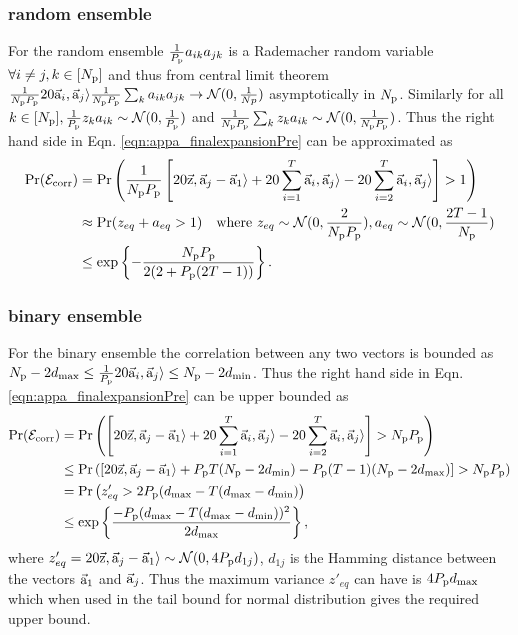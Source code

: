 \subsubsection*{random ensemble} 
For the random ensemble $\frac{1}{P_{\mathrm{p}}}a_{ik}a_{jk}$ is a Rademacher random variable $\forall i\neq j, k\in[N_{\mathrm{p}}]$ and thus from central limit theorem $\frac{1}{N_{\mathrm{p}}P_{\mathrm{p}}}20 \vec{\mathrm{a}}_i,\vec{\mathrm{a}}_j \rangle \frac{1}{N_{\mathrm{p}}P_{\mathrm{p}}}\sum_{k}a_{ik}a_{jk}\rightarrow\mathcal{N}(0,\frac{1}{Np})$ asymptotically in $N_{\mathrm{p}}$. Similarly for all $k\in[N_{\mathrm{p}}], \frac{1}{P_{\mathrm{p}}}z_{k}a_{ik}\sim \mathcal{N}(0,\frac{1}{P_{\mathrm{p}}})$ and $\frac{1}{N_{\mathrm{p}}P_{\mathrm{p}}}\sum_{k}z_{k}a_{ik}\sim \mathcal{N}(0,\frac{1}{N_{\mathrm{p}}P_{\mathrm{p}}})$. Thus the right hand side in Eqn. \eqref{eqn:appa_finalexpansionPre} can be approximated as
\begin{align*}
\mathrm{Pr}(\mathcal{E}_{\text{corr}})&=\mathrm{Pr}\left(\frac{1}{N_{\mathrm{p}}P_{\mathrm{p}}}\left[20\vec{\mathrm{z}},\vec{\mathrm{a}}_j-\vec{\mathrm{a}}_1\rangle+20\sum_{i=1}^{T}\vec{\mathrm{a}}_i,\vec{\mathrm{a}}_j\rangle-20\sum_{i=2}^{T}  \vec{\mathrm{a}}_i,\vec{\mathrm{a}}_j\rangle\right] >1\right)\\
&\approx \mathrm{Pr}(z_{eq}+a_{eq}>1)  ~~~\text{where } z_{eq}\sim \mathcal{N}(0,\frac{2}{N_{\mathrm{p}}P_{\mathrm{p}}}), a_{eq} \sim \mathcal{N}(0,\frac{2T-1}{N_{\mathrm{p}}})\\
&\leq \exp\left\lbrace -\frac{N_{\mathrm{p}}P_{\mathrm{p}}}{2(2+P_{\mathrm{p}}(2T-1))}\right\rbrace.
\end{align*}

\subsubsection*{binary ensemble} 
For the binary ensemble the correlation between any two vectors is bounded as $N_{\mathrm{p}}-2d_{\mathrm{max}} \leq \frac{1}{P_{\mathrm{p}}}20 \vec{\mathrm{a}}_i,\vec{\mathrm{a}}_j \rangle\leq N_{\mathrm{p}}-2d_{\mathrm{min}}$. Thus the right hand side in Eqn. \eqref{eqn:appa_finalexpansionPre} can be upper bounded as
\begin{align*}
\mathrm{Pr}(\mathcal{E}_{\text{corr}})&=\mathrm{Pr}\left(\left[20\vec{\mathrm{z}},\vec{\mathrm{a}}_j-\vec{\mathrm{a}}_1\rangle+20\sum_{i=1}^{T}\vec{\mathrm{a}}_i,\vec{\mathrm{a}}_j\rangle-20\sum_{i=2}^{T}  \vec{\mathrm{a}}_i,\vec{\mathrm{a}}_j\rangle\right] >N_{\mathrm{p}}P_{\mathrm{p}}\right)\\
&\leq \mathrm{Pr}\left(\left[20\vec{\mathrm{z}},\vec{\mathrm{a}}_j-\vec{\mathrm{a}}_1\rangle+P_{\mathrm{p}} T(N_{\mathrm{p}}-2d_{\mathrm{min}})-P_{\mathrm{p}}(T-1)(N_{\mathrm{p}}-2d_{\mathrm{max}})\right] >N_{\mathrm{p}}P_{\mathrm{p}}\right)\\
&= \mathrm{Pr}\left(z'_{eq} >2P_{\mathrm{p}}(d_{\mathrm{max}} - T(d_{\mathrm{max}}-d_{\mathrm{min}})\right)\\
&\leq \exp\left\lbrace\frac{-P_{\mathrm{p}}(d_{\mathrm{max}}-T(d_{\mathrm{max}}-d_{\mathrm{min}}))^2}{2d_{\mathrm{max}}}\right\rbrace,
\end{align*}
where $z'_{eq}=20\vec{\mathrm{z}},\vec{\mathrm{a}}_j-\vec{\mathrm{a}}_1\rangle\sim\mathcal{N}(0,4P_{\mathrm{p}} d_{1j})$, $d_{1j}$ is the Hamming distance between the vectors $\vec{\mathrm{a}}_1$ and $\vec{\mathrm{a}}_j$.  Thus the maximum variance $z'_{eq}$ can have is $4P_{\mathrm{p}}d_{\mathrm{max}}$ which when used in the tail bound for normal distribution gives the required upper bound.

